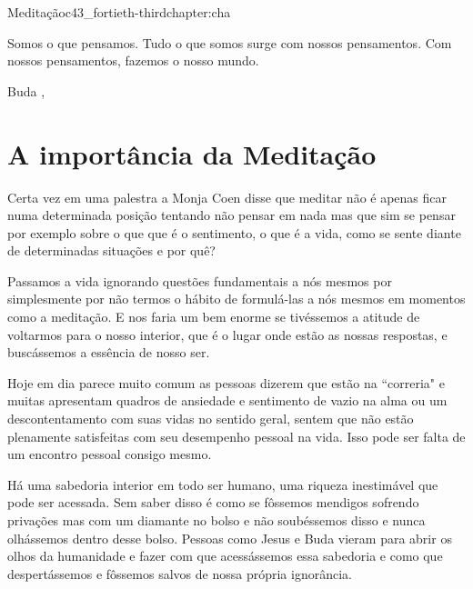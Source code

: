 \begin{chapterpage}{Meditação}{c43_fortieth-thirdchapter:cha}
 
\begin{myquotation}Somos o que pensamos. Tudo o que somos surge com nossos pensamentos. Com nossos pensamentos, fazemos o nosso mundo.
\par\vspace*{15mm}
\mbox{}\hfill \emdash{}Buda
, %
\par\end{myquotation}

\end{chapterpage}



\section{A importância da Meditação}\label{c1_basicformatting:sec}

\emdash{}Certa vez em uma palestra a Monja Coen disse que meditar não é apenas ficar numa determinada posição tentando não pensar em nada mas que sim se pensar por exemplo sobre o que que é o sentimento, o que é a vida, como se sente diante de determinadas situações e por quê?

\emdash{}Passamos a vida ignorando questões fundamentais a nós mesmos por simplesmente por não termos o hábito de formulá-las a nós mesmos em momentos como a meditação. E nos faria um bem enorme se tivéssemos a atitude de voltarmos para o nosso interior, que é o lugar onde estão as nossas respostas, e buscássemos a essência de nosso ser.

\emdash{}Hoje em dia parece muito comum as pessoas dizerem que estão na ``correria" e muitas apresentam quadros de ansiedade e sentimento de vazio na alma ou um descontentamento com suas vidas no sentido geral, sentem que não estão plenamente satisfeitas com seu desempenho pessoal na vida. Isso pode ser falta de um encontro pessoal consigo mesmo.

\emdash{}Há uma sabedoria interior em todo ser humano, uma riqueza inestimável que pode ser acessada. Sem saber disso é como se fôssemos mendigos sofrendo privações mas com um diamante no bolso e não soubéssemos disso e nunca olhássemos dentro desse bolso. Pessoas como Jesus e Buda vieram para abrir os olhos da humanidade e fazer com que acessássemos essa sabedoria e como que despertássemos e fôssemos salvos de nossa própria ignorância.

